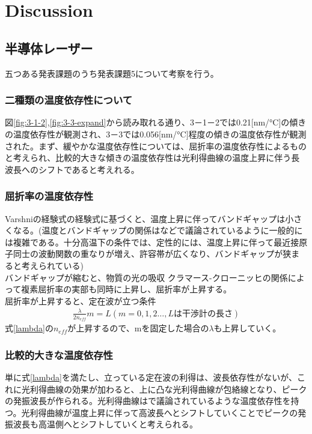 \documentclass[titlepage]{jsarticle}
\begin{document}
\section{Discussion}
\subsection{半導体レーザー}
五つある発表課題のうち発表課題5について考察を行う。\\
\subsubsection{二種類の温度依存性について}
図\ref{fig:3-1-2},\ref{fig:3-3-expand}から読み取れる通り、3－1－2では0.21[\si{nm/\degreeCelsius}]の傾きの温度依存性が観測され、3－3では0.056[\si{nm/\degreeCelsius}]程度の傾きの温度依存性が観測された。まず、緩やかな温度依存性については、屈折率の温度依存性によるものと考えられ、比較的大きな傾きの温度依存性は光利得曲線の温度上昇に伴う長波長へのシフトであると考えれる。
\subsubsection{屈折率の温度依存性}
Varshniの経験式\cite{varshini}の経験式に基づくと、温度上昇に伴ってバンドギャップは小さくなる。(温度とバンドギャップの関係は\cite{bandgap}などで議論されているように一般的には複雑である。十分高温下の条件では、定性的には、温度上昇に伴って最近接原子同士の波動関数の重なりが増え、許容帯が広くなり、バンドギャップが狭まると考えられている\cite{QandA})\\
バンドギャップが縮むと、物質の光の吸収
クラマース-クローニッヒの関係によって複素屈折率の実部も同時に上昇し、屈折率が上昇する。\\
屈折率が上昇すると、定在波が立つ条件
\begin{align}
    \label{lambda}
    \frac{\lambda}{2n_{eff}}m=L(m=0,1,2…,Lは干渉計の長さ)
\end{align}
式\ref{lambda}の$n_{eff}$が上昇するので、mを固定した場合の$\lambda$も上昇していく。
\subsubsection{比較的大きな温度依存性}
単に式\ref{lambda}を満たし、立っている定在波の利得は、波長依存性がないが、これに光利得曲線の効果が加わると、上に凸な光利得曲線が包絡線となり、ピークの発振波長が作られる。光利得曲線は\cite{}で議論されているような温度依存性を持つ。光利得曲線が温度上昇に伴って高波長へとシフトしていくことでピークの発振波長も高温側へとシフトしていくと考えられる。
\end{document}
